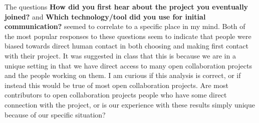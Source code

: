 The questions {\bf How did you first hear about the project you eventually joined?} and {\bf Which technology/tool did you use for initial communication?} seemed to correlate to a specific place in my mind.  Both of the most popular responses to these questions seem to indicate that people were biased towards direct human contact in both choosing and making first contact with their project.  It was suggested in class that this is because we are in a unique setting in that we have direct access to many open collaboration projects and the people working on them.  I am curious if this analysis is correct, or if instead this would be true of most open collaboration projects.  Are most contributors to open collaboration projects people who have some direct connection with the project, or is our experience with these results simply unique because of our specific situation?
